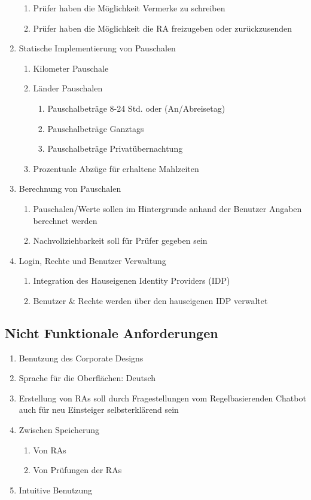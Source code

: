 \begin{enumerate}[label*=\arabic*.]
\begin{enumerate}[label*=\arabic*.]
		\item Prüfer haben die Möglichkeit Vermerke zu schreiben
		\item Prüfer haben die Möglichkeit die RA freizugeben oder zurückzusenden 
	\end{enumerate}
	\item Statische Implementierung von Pauschalen
	\begin{enumerate}[label*=\arabic*.]
		\item Kilometer Pauschale
		\item Länder Pauschalen
		\begin{enumerate}[label*=\arabic*.]
			\item Pauschalbeträge 8-24 Std. oder (An/Abreisetag)
			\item Pauschalbeträge Ganztags
			\item Pauschalbeträge Privatübernachtung
		\end{enumerate}
		\item Prozentuale Abzüge für erhaltene Mahlzeiten
	\end{enumerate}
	\item Berechnung von Pauschalen
	\begin{enumerate}[label*=\arabic*.]
		\item Pauschalen/Werte sollen im Hintergrunde anhand der Benutzer Angaben berechnet werden
		\item Nachvollziehbarkeit soll für Prüfer gegeben sein
	\end{enumerate}
	\item Login, Rechte und Benutzer Verwaltung
	\begin{enumerate}[label*=\arabic*.]
		\item Integration des Hauseigenen Identity Providers (IDP)
		\item Benutzer & Rechte werden über den hauseigenen IDP verwaltet
	\end{enumerate}
\end{enumerate}

\subsection{Nicht Funktionale Anforderungen}
\begin{enumerate}[label*=\arabic*.]
	\item Benutzung des Corporate Designs
	\item Sprache für die Oberflächen: Deutsch
	\item Erstellung von RAs soll durch Fragestellungen vom Regelbasierenden Chatbot auch für neu Einsteiger selbsterklärend sein
	\item Zwischen Speicherung 
	\begin{enumerate}[label*=\arabic*.]
		\item Von RAs
		\item Von Prüfungen der RAs
	\end{enumerate}
	\item Intuitive Benutzung
\end{enumerate}

